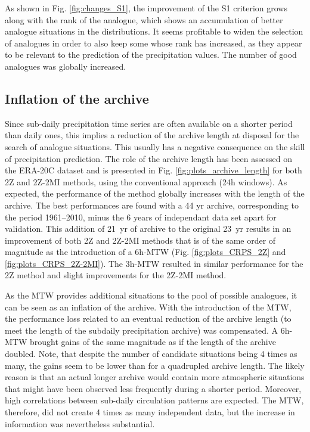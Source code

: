 \documentclass[hess, manuscript]{copernicus}
\begin{document}
	As shown in Fig. \ref{fig:changes_S1}, the improvement of the S1 criterion grows along with the rank of the analogue, which shows an accumulation of better analogue situations in the distributions. It seems profitable to widen the selection of analogues in order to also keep some whose rank has increased, as they appear to be relevant to the prediction of the precipitation values. The number of good analogues was globally increased.
	
	
	\subsection{Inflation of the archive}
	\label{sec:archive_reduction}
	
	Since sub-daily precipitation time series are often available on a shorter period than daily ones, this implies a reduction of the archive length at disposal for the search of analogue situations. This usually has a negative consequence on the skill of precipitation prediction. The role of the archive length has been assessed on the ERA-20C dataset and is presented in Fig. \ref{fig:plots_archive_length} for both 2Z and 2Z-2MI methods, using the conventional approach (24h windows). As expected, the performance of the method globally increases with the length of the archive. The best performances are found with a 44 yr archive, corresponding to the period 1961--2010, minus the 6 years of independant data set apart for validation. This addition of 21~yr of archive to the original 23~yr results in an improvement of both 2Z and 2Z-2MI methods that is of the same order of magnitude as the introduction of a 6h-MTW (Fig. \ref{fig:plots_CRPS_2Z} and \ref{fig:plots_CRPS_2Z-2MI}). The 3h-MTW resulted in similar performance for the 2Z method and slight improvements for the 2Z-2MI method.
	
	As the MTW provides additional situations to the pool of possible analogues, it can be seen as an inflation of the archive. With the introduction of the MTW, the performance loss related to an eventual reduction of the archive length (to meet the length of the subdaily precipitation archive) was compensated. A 6h-MTW brought gains of the same magnitude as if the length of the archive doubled. Note, that despite the number of candidate situations being 4 times as many, the gains seem to be lower than for a quadrupled archive length. The likely reason is that an actual longer archive would contain more atmospheric situations that might have been observed less frequently during a shorter period. Moreover, high correlations between sub-daily circulation patterns are expected. The MTW, therefore, did not create 4 times as many independent data, but the increase in information was nevertheless substantial.
	
\end{document}
